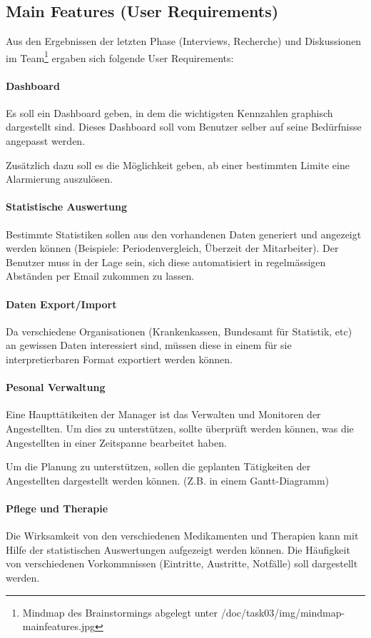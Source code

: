 \documentclass[a4paper]{scrreprt}
\begin{document}
\subsection{Main Features (User Requirements)}
Aus den Ergebnissen der letzten Phase (Interviews, Recherche) und Diskussionen im Team\footnote{Mindmap des Brainstormings abgelegt unter /doc/task03/img/mindmap-mainfeatures.jpg} ergaben sich folgende User Requirements:

\paragraph{Dashboard}
Es soll ein Dashboard geben, in dem die wichtigsten Kennzahlen graphisch dargestellt sind. Dieses Dashboard soll vom Benutzer selber auf seine Bedürfnisse angepasst werden. 

Zusätzlich dazu soll es die Möglichkeit geben, ab einer bestimmten Limite eine Alarmierung auszulösen. 

\paragraph{Statistische Auswertung}
Bestimmte Statistiken sollen aus den vorhandenen Daten generiert und angezeigt werden können (Beispiele: Periodenvergleich, Überzeit der Mitarbeiter). Der Benutzer muss in der Lage sein, sich diese automatisiert in regelmässigen Abständen per Email zukommen zu lassen.

\paragraph{Daten Export/Import}
Da verschiedene Organisationen (Krankenkassen, Bundesamt für Statistik, etc) an gewissen Daten interessiert sind, müssen diese in einem für sie interpretierbaren Format exportiert werden können. 

\paragraph{Pesonal Verwaltung}
Eine Haupttätikeiten der Manager ist das Verwalten und Monitoren der Angestellten. Um dies zu unterstützen, sollte überprüft werden können, was die Angestellten in einer Zeitspanne bearbeitet haben. 

Um die Planung zu unterstützen, sollen die geplanten Tätigkeiten der Angestellten dargestellt werden können. (Z.B. in einem Gantt-Diagramm)

\paragraph{Pflege und Therapie}
Die Wirksamkeit von den verschiedenen Medikamenten und Therapien kann mit Hilfe der statistischen Auswertungen aufgezeigt werden können. Die Häufigkeit von verschiedenen Vorkommnissen (Eintritte, Austritte, Notfälle) soll dargestellt werden. 
\end{document}
